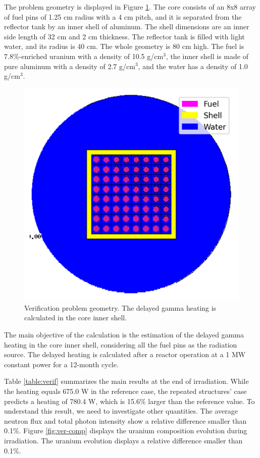 The problem geometry is displayed in Figure \ref{fig:toy-geo2}.
The core consists of an 8x8 array of fuel pins of 1.25 cm radius with a 4 cm pitch, and it is separated from the reflector tank by an inner shell of aluminum.
The shell dimensions are an inner side length of 32 cm and 2 cm thickness.
The reflector tank is filled with light water, and its radius is 40 cm.
The whole geometry is 80 cm high.
The fuel is 7.8\%-enriched uranium with a density of 10.5 g/cm$^3$, the inner shell is made of pure aluminum with a density of 2.7 g/cm$^3$, and the water has a density of 1.0 g/cm$^3$.

\begin{figure}[htbp!] %
    \centering
    \includegraphics[width=0.6\linewidth]{figures/toy-problem-b.png}
    \hfill
    \caption{Verification problem geometry. The delayed gamma heating is calculated in the core inner shell.}
    \label{fig:toy-geo2}
\end{figure}

The main objective of the calculation is the estimation of the delayed gamma heating in the core inner shell, considering all the fuel pins as the radiation source.
The delayed heating is calculated after a reactor operation at a 1 MW constant power for a 12-month cycle.

Table \ref{table:verif} summarizes the main results at the end of irradiation.
While the heating equals 675.0 W in the reference case, the repeated structures' case predicts a heating of 780.4 W, which is 15.6\% larger than the reference value.
To understand this result, we need to investigate other quantities.
The average neutron flux and total photon intensity show a relative difference smaller than 0.1\%.
Figure \ref{fig:ver-comp} displays the uranium composition evolution during irradiation.
The uranium evolution displays a relative difference smaller than 0.1\%.


